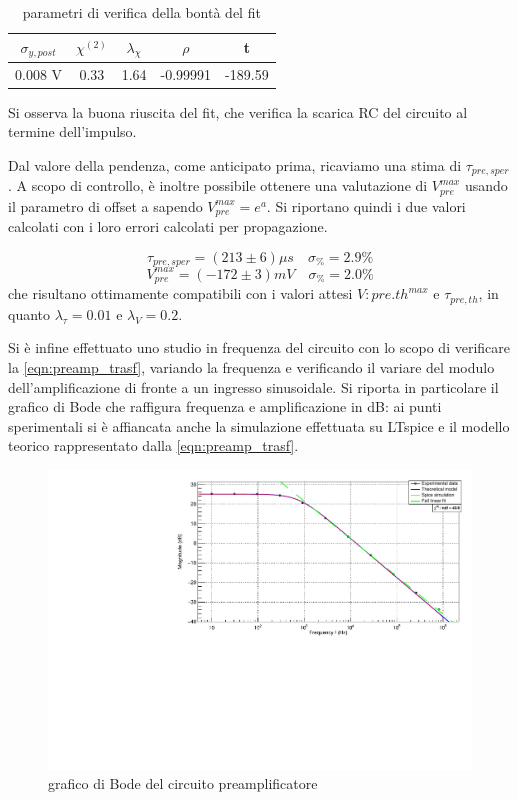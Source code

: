 \documentclass{article}
\begin{document}
\begin{table}[ht]
    \centering
    \begin{tabular}{ccccc}
        \toprule
        $\sigma_{y, post}$    &$\chi^{(2)}$    &$\lambda_{\chi}$   &$\rho$  &t   \\
        \midrule
        0.008 V               &0.33            &1.64              &-0.99991&-189.59\\
        \bottomrule
    \end{tabular}
    \caption{parametri di verifica della bontà del fit}
\end{table}

Si osserva la buona riuscita del fit, che verifica la scarica RC del circuito al termine dell'impulso.

Dal valore della pendenza, come anticipato prima, ricaviamo una stima di $\tau_{pre,sper}$. A scopo di controllo, è inoltre possibile 
ottenere una valutazione di $V_{pre}^{max}$ usando il parametro di offset a sapendo $V_{pre}^{max} = e^a$. Si riportano quindi i due
valori calcolati con i loro errori calcolati per propagazione.

\[\tau_{pre,sper} = (213 \pm 6)\mu s \quad \sigma_{\%} = 2.9 \%    \]
\[V_{pre}^{max} = (-172 \pm 3)mV \quad \sigma_{\%} = 2.0 \%\]
che risultano ottimamente compatibili con i valori attesi $V:{pre.th}^{max}$ e $\tau_{pre,th}$, in quanto $\lambda_{\tau} = 0.01$
e $\lambda_{V}=0.2$.

Si è infine effettuato uno studio in frequenza del circuito con lo scopo di verificare la \ref{eqn:preamp_trasf}, variando la frequenza
e verificando il variare del modulo dell'amplificazione di fronte a un ingresso sinusoidale.
Si riporta in particolare il grafico di Bode che raffigura frequenza e amplificazione in dB: ai punti sperimentali si è affiancata
anche la simulazione effettuata su LTspice e il modello teorico rappresentato dalla \ref{eqn:preamp_trasf}.

\begin{center}
\begin{figure}[H]
\centering
\includegraphics[scale=0.4, angle=0]{bodepreamp.pdf}
\caption{grafico di Bode del circuito preamplificatore}
\label{fig:bodepreamp}
\end{figure}
\end{center}
\end{document}

